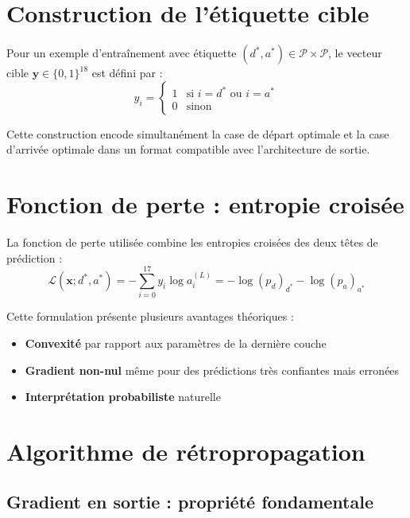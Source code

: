 \documentclass[12pt,a4paper]{report}
\numberwithin{equation}{section}
\begin{document}
\section{Construction de l'étiquette cible}

\begin{definition}
Pour un exemple d'entraînement avec étiquette $(d^*, a^*) \in \mathcal{P} \times \mathcal{P}$, le vecteur cible $\mathbf{y} \in \{0,1\}^{18}$ est défini par :
$$y_i = \begin{cases}
1 & \text{si } i = d^* \text{ ou }i = a^*\\
0 & \text{sinon}
\end{cases}$$
\end{definition}

Cette construction encode simultanément la case de départ optimale et la case d'arrivée optimale dans un format compatible avec l'architecture de sortie.

\section{Fonction de perte : entropie croisée}

\begin{definition}
La fonction de perte utilisée combine les entropies croisées des deux têtes de prédiction :
$$\mathcal{L}(\mathbf{x}; d^*, a^*) = -\sum_{i=0}^{17} y_i \log a^{(L)}_i = -\log(p_d)_{d^*} - \log(p_a)_{a^*}$$
\end{definition}

Cette formulation présente plusieurs avantages théoriques :
\begin{itemize}
  \item \textbf{Convexité} par rapport aux paramètres de la dernière couche
  \item \textbf{Gradient non-nul} même pour des prédictions très confiantes mais erronées
  \item \textbf{Interprétation probabiliste} naturelle
\end{itemize}

\section{Algorithme de rétropropagation}

\subsection{Gradient en sortie : propriété fondamentale}
\end{document}
